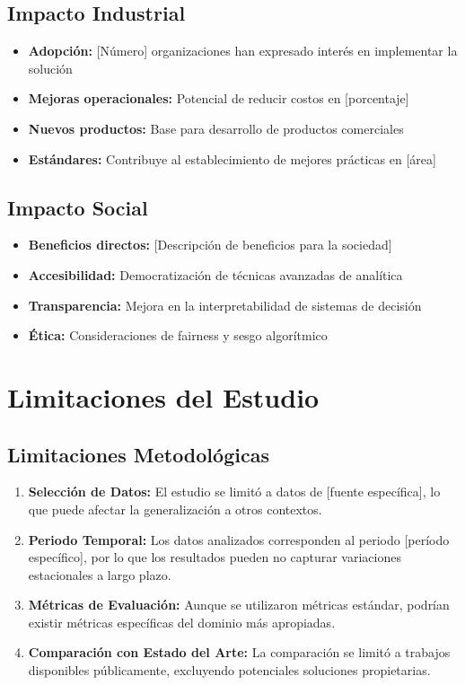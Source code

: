 \subsection{Impacto Industrial}

\begin{itemize}
    \item \textbf{Adopción:} [Número] organizaciones han expresado interés en implementar la solución
    \item \textbf{Mejoras operacionales:} Potencial de reducir costos en [porcentaje]%
    \item \textbf{Nuevos productos:} Base para desarrollo de productos comerciales
    \item \textbf{Estándares:} Contribuye al establecimiento de mejores prácticas en [área]
\end{itemize}

\subsection{Impacto Social}

\begin{itemize}
    \item \textbf{Beneficios directos:} [Descripción de beneficios para la sociedad]
    \item \textbf{Accesibilidad:} Democratización de técnicas avanzadas de analítica
    \item \textbf{Transparencia:} Mejora en la interpretabilidad de sistemas de decisión
    \item \textbf{Ética:} Consideraciones de fairness y sesgo algorítmico
\end{itemize}

\section{Limitaciones del Estudio}

\subsection{Limitaciones Metodológicas}

\begin{enumerate}
    \item \textbf{Selección de Datos:} El estudio se limitó a datos de [fuente específica], lo que puede afectar la generalización a otros contextos.
    
    \item \textbf{Periodo Temporal:} Los datos analizados corresponden al periodo [período específico], por lo que los resultados pueden no capturar variaciones estacionales a largo plazo.
    
    \item \textbf{Métricas de Evaluación:} Aunque se utilizaron métricas estándar, podrían existir métricas específicas del dominio más apropiadas.
    
    \item \textbf{Comparación con Estado del Arte:} La comparación se limitó a trabajos disponibles públicamente, excluyendo potenciales soluciones propietarias.
\end{enumerate}

